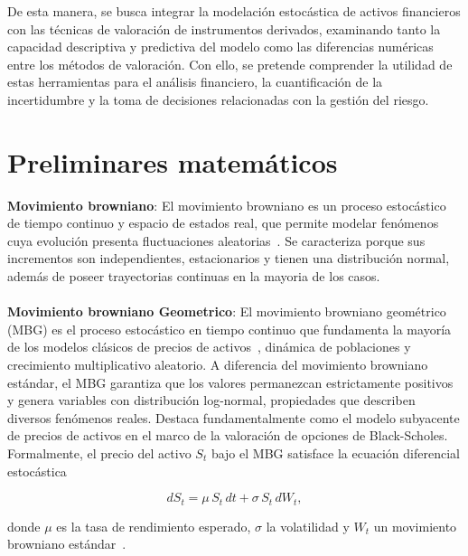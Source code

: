 \documentclass{article}
\begin{document}
De esta manera, se busca integrar la modelación estocástica de activos financieros con las técnicas de valoración de instrumentos derivados, examinando tanto la capacidad descriptiva y predictiva del modelo como las diferencias numéricas entre los métodos de valoración. Con ello, se pretende comprender la utilidad de estas herramientas para el análisis financiero, la cuantificación de la incertidumbre y la toma de decisiones relacionadas con la gestión del riesgo.

\section*{Preliminares matemáticos}

\textbf{Movimiento browniano}: El movimiento browniano es un proceso estocástico de tiempo continuo y espacio de estados real, que permite modelar fenómenos cuya evolución presenta fluctuaciones aleatorias~\cite{einstein1905brownian, siegrist2022brownian}. Se caracteriza porque sus incrementos son independientes, estacionarios y tienen una distribución normal, además de poseer trayectorias continuas en la mayoria de los casos.
\\
\\
\textbf{Movimiento browniano Geometrico}: El movimiento browniano geométrico (MBG) es el proceso estocástico en tiempo continuo que fundamenta la mayoría de los modelos clásicos de precios de activos~\cite{metricgate2025mbg}, dinámica de poblaciones y crecimiento multiplicativo aleatorio. A diferencia del movimiento browniano estándar, el MBG garantiza que los valores permanezcan estrictamente positivos y genera variables con distribución log-normal, propiedades que describen diversos fenómenos reales. Destaca fundamentalmente como el modelo subyacente de precios de activos en el marco de la valoración de opciones de Black-Scholes. Formalmente, el precio del activo $S_t$ bajo el MBG satisface la ecuación diferencial estocástica

\begin{equation}
dS_t=\mu\,S_t\,dt+\sigma\,S_t\,dW_t,
\label{eq:mbg}
\end{equation}

donde $\mu$ es la tasa de rendimiento esperado, $\sigma$ la volatilidad y $W_t$ un movimiento browniano estándar~\cite{metricgate2025mbg}.
\end{document}
